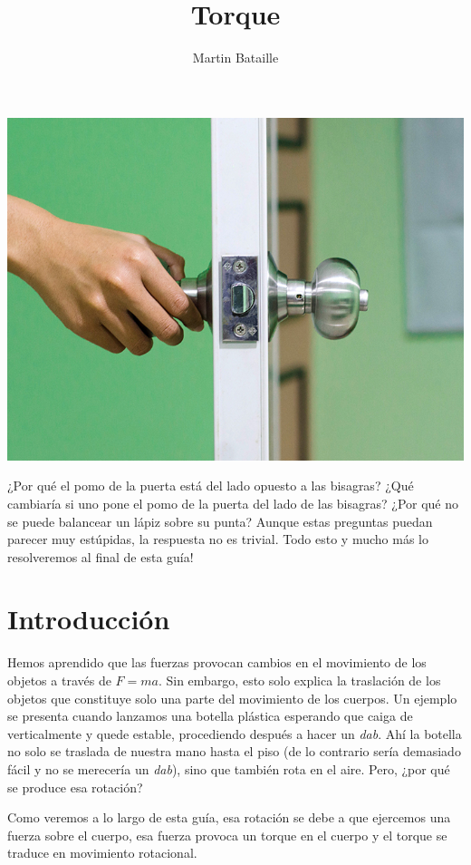 \documentclass[letterpaper]{article}
\author{Martin Bataille}
\date{}
\title{\bf Torque}
\begin{document}
\maketitle
\thispagestyle{fancy}
\begin{center}
\includegraphics[scale=0.6]{portada.jpg}
\end{center}
\pagebreak

¿Por qué el pomo de la puerta está del lado opuesto a las bisagras? ¿Qué cambiaría si uno pone el pomo de la puerta del lado de las bisagras? ¿Por qué no se puede balancear un lápiz sobre su punta? Aunque estas preguntas puedan parecer muy estúpidas, la respuesta no es trivial. Todo esto y mucho más lo resolveremos al final de esta guía!

\section*{Introducción}

Hemos aprendido que las fuerzas provocan cambios en el movimiento de los objetos a través de $F = ma$. Sin embargo, esto solo explica la traslación de los objetos que constituye solo una parte del movimiento de los cuerpos. Un ejemplo se presenta cuando lanzamos una botella plástica esperando que caiga de verticalmente y quede estable, procediendo después a hacer un \emph{dab}. Ahí la botella no solo se traslada de nuestra mano hasta el piso (de lo contrario sería demasiado fácil y no se merecería un \emph{dab}), sino que también rota en el aire. Pero, ¿por qué se produce esa rotación?

Como veremos a lo largo de esta guía, esa rotación se debe a que ejercemos una fuerza sobre el cuerpo, esa fuerza provoca un torque en el cuerpo y el torque se traduce en movimiento rotacional.
\end{document}
